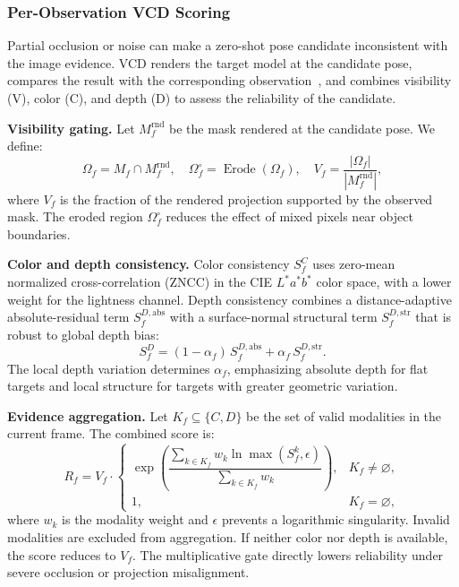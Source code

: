 \documentclass[review]{vgtc}
\begin{document}
\subsubsection{Per-Observation VCD Scoring}

Partial occlusion or noise can make a zero-shot pose candidate inconsistent with the image evidence. VCD renders the target model at the candidate pose, compares the result with the corresponding observation~\cite{deepim2018,latentfusion2020,focalpose2022}, and combines visibility (V), color (C), and depth (D) to assess the reliability of the candidate.

\textbf{Visibility gating.}
Let $M_f^{\mathrm{rnd}}$ be the mask rendered at the candidate pose. We define:
\begin{equation}
\Omega_f = M_f \cap M_f^{\mathrm{rnd}}, \quad \Omega_f^{\circ} = \operatorname{Erode}(\Omega_f), \quad V_f = \frac{|\Omega_f|}{|M_f^{\mathrm{rnd}}|},
\label{eq:visibility}
\end{equation}
where $V_f$ is the fraction of the rendered projection supported by the observed mask. The eroded region $\Omega_f^\circ$ reduces the effect of mixed pixels near object boundaries.

\textbf{Color and depth consistency.}
Color consistency $S_f^C$ uses zero-mean normalized cross-correlation (ZNCC) in the CIE $L^*a^*b^*$ color space, with a lower weight for the lightness channel. Depth consistency combines a distance-adaptive absolute-residual term $S_f^{D,\mathrm{abs}}$ with a surface-normal structural term $S_f^{D,\mathrm{str}}$ that is robust to global depth bias:
\begin{equation}
S_f^D = (1-\alpha_f)\,S_f^{D,\mathrm{abs}} + \alpha_f\,S_f^{D,\mathrm{str}}.
\label{eq:depth-score}
\end{equation}
The local depth variation determines $\alpha_f$, emphasizing absolute depth for flat targets and local structure for targets with greater geometric variation.

\textbf{Evidence aggregation.}
Let $K_f\subseteq\{C,D\}$ be the set of valid modalities in the current frame. The combined score is:
\begin{equation}
R_f = V_f \cdot
\begin{cases}
\exp\!\left(\dfrac{\sum_{k \in K_f} w_k \ln \max(S_f^{k}, \epsilon)}{\sum_{k \in K_f} w_k}\right), & K_f \neq \varnothing, \\[6pt]
1, & K_f = \varnothing,
\end{cases}
\label{eq:vcd}
\end{equation}
where $w_k$ is the modality weight and $\epsilon$ prevents a logarithmic singularity. Invalid modalities are excluded from aggregation. If neither color nor depth is available, the score reduces to $V_f$. The multiplicative gate directly lowers reliability under severe occlusion or projection misalignment.
\end{document}
